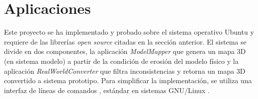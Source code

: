 \section{Aplicaciones}

Este proyecto se ha implementado y probado sobre el sistema operativo Ubuntu \cite{ubuntu} y requiere de las librerías \textit{open source} citadas en la sección anterior. El sistema se divide en dos componentes, la aplicación \textit{ModelMapper} que genera un mapa 3D (en sistema modelo) a partir de la condición de erosión del modelo físico y la aplicación \textit{RealWorldConverter} que filtra inconsistencias y retorna un mapa 3D convertido a sistema prototipo. Para simplificar la implementación, se utiliza una interfaz de líneas de comandos \cite{wiki-linea-de-comandos}, estándar en sistemas GNU/Linux \cite{wiki-gnu-linux}.

